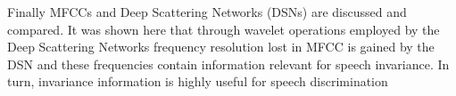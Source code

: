 Finally MFCCs and Deep Scattering Networks (DSNs) are discussed and compared. It was shown here that through wavelet operations employed by the Deep Scattering Networks frequency resolution lost in MFCC is gained by the DSN and these frequencies contain information relevant for speech invariance. In turn, invariance information is highly useful for speech discrimination
